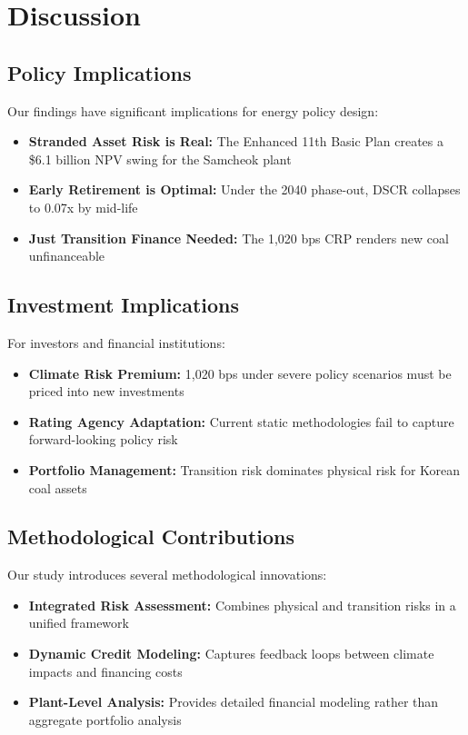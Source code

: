 \documentclass[11pt,a4paper]{article}
\begin{document}
\section{Discussion}

\subsection{Policy Implications}

Our findings have significant implications for energy policy design:

\begin{itemize}
\item \textbf{Stranded Asset Risk is Real:} The Enhanced 11th Basic Plan creates a \$6.1 billion NPV swing for the Samcheok plant
\item \textbf{Early Retirement is Optimal:} Under the 2040 phase-out, DSCR collapses to 0.07x by mid-life
\item \textbf{Just Transition Finance Needed:} The 1,020 bps CRP renders new coal unfinanceable
\end{itemize}

\subsection{Investment Implications}

For investors and financial institutions:

\begin{itemize}
\item \textbf{Climate Risk Premium:} 1,020 bps under severe policy scenarios must be priced into new investments
\item \textbf{Rating Agency Adaptation:} Current static methodologies fail to capture forward-looking policy risk
\item \textbf{Portfolio Management:} Transition risk dominates physical risk for Korean coal assets
\end{itemize}

\subsection{Methodological Contributions}

Our study introduces several methodological innovations:

\begin{itemize}
\item \textbf{Integrated Risk Assessment:} Combines physical and transition risks in a unified framework
\item \textbf{Dynamic Credit Modeling:} Captures feedback loops between climate impacts and financing costs
\item \textbf{Plant-Level Analysis:} Provides detailed financial modeling rather than aggregate portfolio analysis
\end{itemize}
\end{document}
